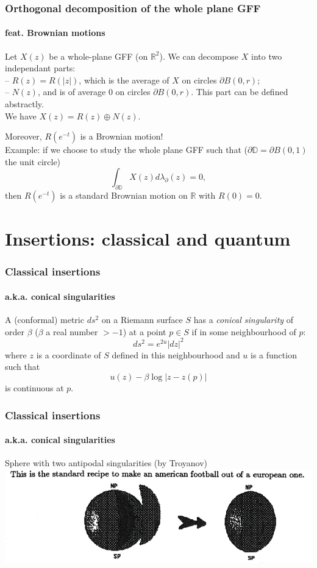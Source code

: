 \documentclass[aspectratio=169]{beamer}
\begin{document}
\begin{frame}
\frametitle{Orthogonal decomposition of the whole plane GFF}
\framesubtitle{feat. Brownian motions}
\begin{theorem}
Let $X(z)$ be a whole-plane GFF (on $\mathbb{R}^2$). We can decompose $X$ into two independant parts:\\
-- $R(z)=R(|z|)$, which is the average of $X$ on circles $\partial B(0,r)$;\\
-- $N(z)$, and is of average $0$ on circles $\partial B(0,r)$. This part can be defined abstractly.\\
We have $X(z)=R(z)\oplus N(z)$.\\
\end{theorem}
Moreover, $R(e^{-t})$ is a Brownian motion!\\
Example: if we choose to study the whole plane GFF such that ($\partial\mathbb{D}=\partial B(0,1)$ the unit circle)
$$\int_{\partial{\mathbb{D}}}X(z)d\lambda_{\partial}(z)=0,$$
then $R(e^{-t})$ is a standard Brownian motion on $\mathbb{R}$ with $R(0)=0$.
\end{frame}


\section{Insertions: classical and quantum}

\begin{frame}
\frametitle{Classical insertions}
\framesubtitle{a.k.a. conical singularities}
\begin{definition}
A (conformal) metric $ds^2$ on a Riemann surface $S$ has a \emph{conical singularity} of order $\beta$ ($\beta$ a real number $>-1$) at a point $p\in S$ if in some neighbourhood of $p$:
$$ds^2=e^{2u}|dz|^2$$
where $z$ is a coordinate of $S$ defined in this neighbourhood and $u$ is a function such that
$$u(z)-\beta\log|z-z(p)|$$
is continuous at $p$.
\end{definition}
\end{frame}

\begin{frame}
\frametitle{Classical insertions}
\framesubtitle{a.k.a. conical singularities}
\begin{block}{Sphere with two antipodal singularities (by Troyanov)}
\includegraphics[width=\textwidth]{Football.png}
\end{block}
\end{frame}
\end{document}
